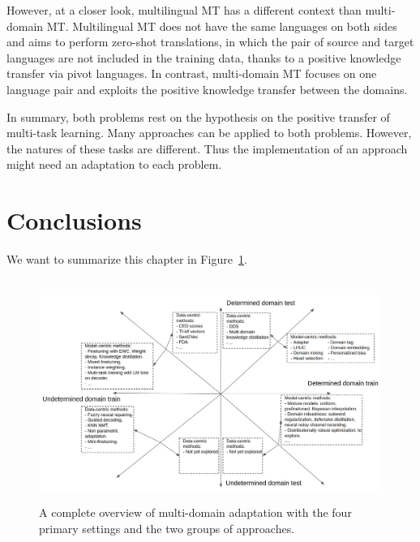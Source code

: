 However, at a closer look, multilingual MT has a different context than multi-domain MT. Multilingual MT does not have the same languages on both sides and aims to perform zero-shot translations, in which the pair of source and target languages are not included in the training data, thanks to a positive knowledge transfer via pivot languages. In contrast, multi-domain MT focuses on one language pair and exploits the positive knowledge transfer between the domains.

In summary, both problems rest on the hypothesis on the positive transfer of multi-task learning. Many approaches can be applied to both problems. However, the natures of these tasks are different. Thus the implementation of an approach might need an adaptation to each problem.

\section{Conclusions}
We want to summarize this chapter in Figure~\ref{fig:review_mdmt}.
\begin{figure}[htbp]
  \hbox{\hspace{-3.5em}  \includegraphics[width=1.2\textwidth]{graphics/review_mdmt}}
  \caption{A complete overview of multi-domain adaptation with the four primary settings and the two groups of approaches.}
\label{fig:review_mdmt}
\end{figure}

